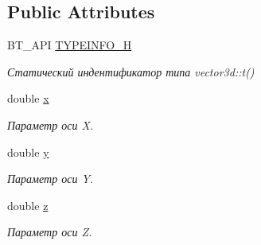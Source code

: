 \subsection*{Public Attributes}
\begin{DoxyCompactItemize}
\item 
\hypertarget{classbt_1_1vector3d_aadd401f6c144fc6f52e35f95fa9db4ee}{B\-T\-\_\-\-A\-P\-I \hyperlink{classbt_1_1vector3d_aadd401f6c144fc6f52e35f95fa9db4ee}{T\-Y\-P\-E\-I\-N\-F\-O\-\_\-\-H}}\label{classbt_1_1vector3d_aadd401f6c144fc6f52e35f95fa9db4ee}

\begin{DoxyCompactList}\small\item\em Статический индентификатор типа vector3d\-::t() \end{DoxyCompactList}\item 
\hypertarget{classbt_1_1vector3d_a58349669479849f3a7b00924724f7f7c}{double \hyperlink{classbt_1_1vector3d_a58349669479849f3a7b00924724f7f7c}{x}}\label{classbt_1_1vector3d_a58349669479849f3a7b00924724f7f7c}

\begin{DoxyCompactList}\small\item\em Параметр оси X. \end{DoxyCompactList}\item 
\hypertarget{classbt_1_1vector3d_acb2148a436126426c55cbf647399d549}{double \hyperlink{classbt_1_1vector3d_acb2148a436126426c55cbf647399d549}{y}}\label{classbt_1_1vector3d_acb2148a436126426c55cbf647399d549}

\begin{DoxyCompactList}\small\item\em Параметр оси Y. \end{DoxyCompactList}\item 
\hypertarget{classbt_1_1vector3d_a3272fc6d42cecb777911c97d918e9110}{double \hyperlink{classbt_1_1vector3d_a3272fc6d42cecb777911c97d918e9110}{z}}\label{classbt_1_1vector3d_a3272fc6d42cecb777911c97d918e9110}

\begin{DoxyCompactList}\small\item\em Параметр оси Z. \end{DoxyCompactList}\end{DoxyCompactItemize}
